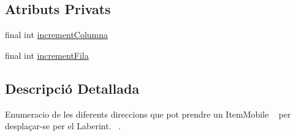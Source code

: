 \subsection*{Atributs Privats}
\begin{DoxyCompactItemize}
\item 
final int \hyperlink{enumlogica_1_1enumeracions_1_1_e_direccio_a55188904e0a2d50611f032d0fed63fac}{increment\+Columna}
\item 
final int \hyperlink{enumlogica_1_1enumeracions_1_1_e_direccio_a7f54d2a6315924892ed78da3635a6358}{increment\+Fila}
\end{DoxyCompactItemize}


\subsection{Descripció Detallada}
Enumeracio de les diferents direccions que pot prendre un Item\+Mobile ~\newline
per desplaçar-\/se per el Laberint.~\newline
. 

